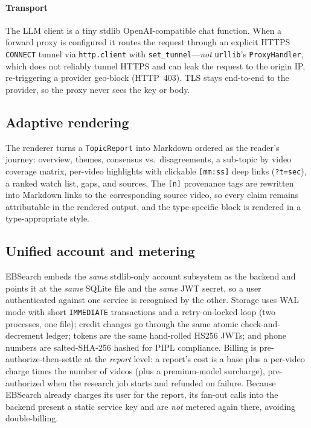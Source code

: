 \documentclass[conference]{IEEEtran}
\begin{document}
\paragraph{Transport} The LLM client is a tiny stdlib OpenAI-compatible chat
function. When a forward proxy is configured it routes the request through an
explicit HTTPS \texttt{CONNECT} tunnel via \texttt{http.client} with
\texttt{set\_tunnel}---\emph{not} \texttt{urllib}'s \texttt{ProxyHandler}, which
does not reliably tunnel HTTPS and can leak the request to the origin IP,
re-triggering a provider geo-block (HTTP~403). TLS stays end-to-end to the
provider, so the proxy never sees the key or body.

\subsection{Adaptive rendering}

The renderer turns a \texttt{TopicReport} into Markdown ordered as the reader's
journey: overview, themes, consensus vs.\ disagreements, a sub-topic by video
coverage matrix, per-video highlights with clickable \texttt{[mm:ss]} deep links
(\texttt{?t=sec}), a ranked watch list, gaps, and sources. The \texttt{[n]}
provenance tags are rewritten into Markdown links to the corresponding source
video, so every claim remains attributable in the rendered output, and the
type-specific block is rendered in a type-appropriate style.

\subsection{Unified account and metering}
\label{sec:account}

EBSearch embeds the \emph{same} stdlib-only account subsystem as the backend and
points it at the \emph{same} SQLite file and the \emph{same} JWT secret, so a
user authenticated against one service is recognised by the other. Storage uses
WAL mode with short \texttt{IMMEDIATE} transactions and a retry-on-locked loop
(two processes, one file); credit changes go through the same atomic
check-and-decrement ledger; tokens are the same hand-rolled HS256 JWTs; and
phone numbers are salted-SHA-256 hashed for PIPL compliance. Billing is
pre-authorize-then-settle at the \emph{report} level: a report's cost is a base
plus a per-video charge times the number of videos (plus a premium-model
surcharge), pre-authorized when the research job starts and refunded on failure.
Because EBSearch already charges its user for the report, its fan-out calls into
the backend present a static service key and are \emph{not} metered again there,
avoiding double-billing.
\end{document}
